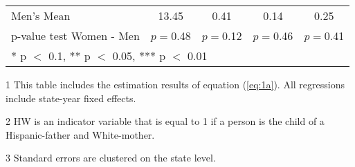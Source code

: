 \begin{table}[H]
\begin{threeparttable}
\begin{tabular}[t]{lcccc}
Men's Mean & 13.45 & 0.41 & 0.14 & 0.25\\
p-value test Women - Men & $p=$0.48 & $p=$0.12 & $p=$0.46 & $p=$0.41\\
\bottomrule
\multicolumn{5}{l}{\rule{0pt}{1em}* p $<$ 0.1, ** p $<$ 0.05, *** p $<$ 0.01}\\
\end{tabular}
\begin{tablenotes}
\item[1] {\footnotesize{This table includes the estimation results of equation (\ref{eq:1a}). All regressions include state-year fixed effects.}}
\item[2] {\footnotesize{HW is an indicator variable that is equal to 1 if a person is the child of a Hispanic-father and White-mother.}}
\item[3] {\footnotesize{Standard errors are clustered on the state level.}}
\end{tablenotes}
\end{threeparttable}
\end{table}
